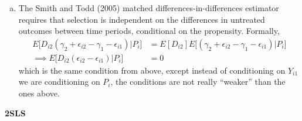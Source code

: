 \documentclass[11pt]{article}
\begin{document}
\begin{enumerate}[(a)]
	\item The Smith and Todd (2005) matched differences-in-differences estimator requires that selection is independent on the differences in untreated outcomes between time periods, conditional on the propensity. Formally,
	\begin{align*}
		E \bigg[ D_{i2} (\gamma_2 + \epsilon_{i2} - \gamma_1 - \epsilon_{i1} ) \bigg| P_{i} \bigg] &= E[D_{i2}] E \bigg[  (\gamma_2 + \epsilon_{i2} - \gamma_1 - \epsilon_{i1} ) \bigg| P_{i} \bigg] \\
		\implies E \bigg[ D_{i2} (\epsilon_{i2} - \epsilon_{i1} ) \bigg| P_{i} \bigg] &= 0
	\end{align*}
	which is the same condition from above, except instead of conditioning on $Y_{i1}$ we are conditioning on $P_i$, the conditions are not really ``weaker'' than the ones above.

\end{enumerate}


\bigskip \textbf{2SLS}
\end{document}
